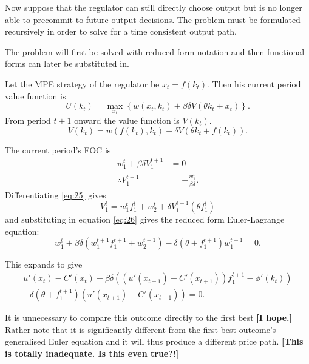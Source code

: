 \documentclass{amsart}
\begin{document}
Now suppose that the regulator can still directly choose output but is
no longer able to precommit to future output decisions. The problem
must be formulated recursively in order to solve for a time consistent
output path.

The problem will first be solved with reduced form notation and then
functional forms can later be substituted in.

Let the MPE strategy of the regulator be $x_t = f(k_t)$. Then his
current period value function is
\begin{equation}
  \label{eq:24} U(k_t) = \max_{x_t} \left\{ w(x_t,k_t) + \beta\delta
V( \theta k_t + x_t) \right\}.
\end{equation} From period $t+1$ onward the value function is
$V(k_t)$.
\begin{equation}
  \label{eq:25} V(k_t) = w\left( f(k_t),k_t\right) + \delta V\left(
\theta k_t + f(k_t) \right).
\end{equation}

The current period's FOC is
\begin{align} w^t_1 + \beta\delta V^{t+1}_1 &= 0 \\ \label{eq:26}
\therefore V^{t+1}_1 &= -\frac{w^t_1}{\beta\delta}.
\end{align} Differentiating \eqref{eq:25} gives
\begin{equation}
  \label{eq:27} V^t_1 = w^t_1f^t_1 + w^t_2 + \delta V^{t+1}_1 (\theta
f^t_1)
\end{equation} and substituting in equation \eqref{eq:26} gives the
reduced form Euler-Lagrange equation:
\begin{equation}
  \label{eq:28} w^t_1 + \beta\delta( w^{t+1}_1 f^{t+1}_1 + w^{t+1}_2 )
- \delta (\theta + f^{t+1}_1)w^{t+1}_1 = 0.
\end{equation}

This expands to give
\begin{multline}
  \label{eq:29}
  u'(x_t) - C'(x_t) + \beta\delta\left( \left(
      u'(x_{t+1}) - C'(x_{t+1}) \right) f^{t+1}_1 - \phi'(k_t) \right)\\
  - \delta (\theta + f^{t+1}_1)\left( u'(x_{t+1}) - C'(x_{t+1})
  \right) = 0.
\end{multline}

It is unnecessary to compare this outcome directly to the first best
\textbf{[I hope.]} Rather note that it is significantly different from
the first best outcome's generalised Euler equation and it will thus
produce a different price path. \textbf{[This is totally inadequate.
  Is this even true?!]}
\end{document}
